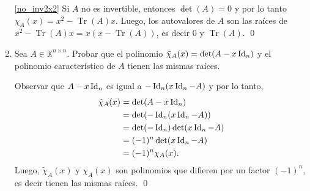 \begin{enumerate}[resume,topsep=6pt,itemsep=.4cm]
    \ref{no_inv2x2} Si $A$ no es invertible, entonces $\det(A)=0$ y por lo tanto $\chi_A(x) = x^2-\operatorname{Tr}(A)x$. Luego, los autovalores de $A$ son las raíces de $x^2-\operatorname{Tr}(A)x = x(x-\operatorname{Tr}(A))$, es decir $0$ y $\operatorname{Tr}(A)$. \qed


    
        
        
    \item Sea $A\in\mathbb{K}^{n\times n}$. Probar que el polinomio $\tilde\chi_A(x)=\det(A-x\operatorname{Id}_n)$ y el polinomio característico de $A$ tienen las mismas raíces.
    
    \rta Observar que $A-x\operatorname{Id}_n$ es igual a $-\operatorname{Id}_n(x\operatorname{Id}_n-A)$ y por lo tanto,
    \begin{align*}
        \tilde\chi_A(x) &= \det(A-x\operatorname{Id}_n) \\
        &= \det(-\operatorname{Id}_n(x\operatorname{Id}_n-A)) \\
        &= \det(-\operatorname{Id}_n)\det(x\operatorname{Id}_n-A) \\
        &= (-1)^n\det(x\operatorname{Id}_n-A) \\
        &= (-1)^n\chi_A(x).
    \end{align*}
    Luego, $\tilde\chi_A(x)$ y $\chi_A(x)$ son polinomios que difieren por un factor $(-1)^n$, es decir tienen las mismas raíces. \qed

    
    \end{enumerate}
    
